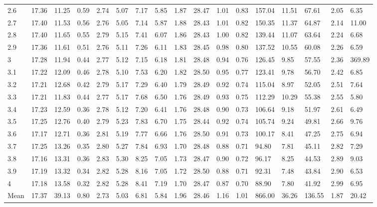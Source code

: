 \begin{adjustbox}{angle=90}
\begin{center}
\begin{tabular}{|l|llllllllllllllll|}
2.6&17.36&11.25&0.59&2.74&5.07&7.17&5.85&1.87&28.47&1.01&0.83&157.04&11.51&67.61&2.05&6.35  \\ 
2.7&17.40&11.53&0.56&2.76&5.05&7.14&5.87&1.88&28.43&1.01&0.82&150.35&11.37&64.87&2.14&11.00  \\ 
2.8&17.40&11.65&0.55&2.79&5.15&7.41&6.07&1.86&28.43&1.00&0.82&139.44&11.07&63.64&2.24&6.68  \\ 
2.9&17.36&11.61&0.51&2.76&5.11&7.26&6.11&1.83&28.45&0.98&0.80&137.52&10.55&60.08&2.26&6.59  \\ 
3&17.28&11.94&0.44&2.77&5.12&7.15&6.18&1.81&28.48&0.94&0.76&126.45&9.85&57.55&2.36&369.89  \\ 
3.1&17.22&12.09&0.46&2.78&5.10&7.53&6.20&1.82&28.50&0.95&0.77&123.41&9.78&56.70&2.42&6.85  \\ 
3.2&17.21&12.68&0.42&2.79&5.17&7.29&6.40&1.79&28.49&0.92&0.74&115.04&8.97&52.05&2.51&7.64  \\ 
3.3&17.21&11.83&0.44&2.77&5.17&7.68&6.50&1.76&28.49&0.93&0.75&112.29&10.29&55.38&2.55&5.80  \\ 
3.4&17.23&12.59&0.36&2.78&5.12&7.20&6.41&1.76&28.48&0.90&0.73&106.64&9.18&51.97&2.61&6.49  \\ 
3.5&17.25&12.76&0.40&2.79&5.23&7.83&6.70&1.75&28.44&0.92&0.74&105.74&9.24&49.81&2.66&9.76  \\ 
3.6&17.17&12.71&0.36&2.81&5.19&7.77&6.66&1.76&28.50&0.91&0.73&100.17&8.41&47.25&2.75&6.94  \\ 
3.7&17.25&13.26&0.35&2.80&5.27&7.84&6.93&1.70&28.48&0.88&0.71&94.80&7.81&45.11&2.82&7.29  \\ 
3.8&17.16&13.31&0.36&2.83&5.30&8.25&7.05&1.73&28.47&0.90&0.72&96.17&8.25&44.53&2.89&9.03  \\ 
3.9&17.19&13.32&0.34&2.82&5.28&8.16&7.05&1.72&28.50&0.88&0.71&92.31&7.48&43.84&2.90&6.53  \\ 
4&17.18&13.58&0.32&2.82&5.28&8.41&7.19&1.70&28.47&0.87&0.70&88.90&7.80&41.92&2.99&6.95  \\ \hline \hline
Mean&17.37&39.13&0.80&2.73&5.03&6.81&5.84&1.96&28.46&1.16&1.01&866.00&36.26&136.55&1.87&20.42  \\ \hline
\end{tabular}
\end{center}
\end{adjustbox}






